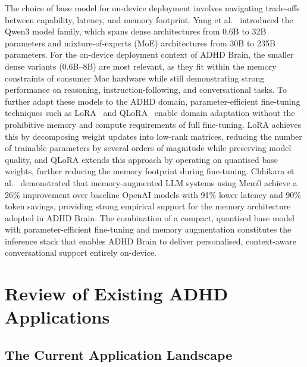 The choice of base model for on-device deployment involves navigating trade-offs between capability, latency, and memory footprint. Yang et al.~\cite{yang2025} introduced the Qwen3 model family, which spans dense architectures from 0.6B to 32B parameters and mixture-of-experts (MoE) architectures from 30B to 235B parameters. For the on-device deployment context of ADHD Brain, the smaller dense variants (0.6B--8B) are most relevant, as they fit within the memory constraints of consumer Mac hardware while still demonstrating strong performance on reasoning, instruction-following, and conversational tasks. To further adapt these models to the ADHD domain, parameter-efficient fine-tuning techniques such as LoRA~\cite{hu2022} and QLoRA~\cite{dettmers2023} enable domain adaptation without the prohibitive memory and compute requirements of full fine-tuning. LoRA achieves this by decomposing weight updates into low-rank matrices, reducing the number of trainable parameters by several orders of magnitude while preserving model quality, and QLoRA extends this approach by operating on quantised base weights, further reducing the memory footprint during fine-tuning. Chhikara et al.~\cite{chhikara2025} demonstrated that memory-augmented LLM systems using Mem0 achieve a 26\% improvement over baseline OpenAI models with 91\% lower latency and 90\% token savings, providing strong empirical support for the memory architecture adopted in ADHD Brain. The combination of a compact, quantised base model with parameter-efficient fine-tuning and memory augmentation constitutes the inference stack that enables ADHD Brain to deliver personalised, context-aware conversational support entirely on-device.

\section{Review of Existing ADHD Applications}
\label{sec:litrev_existing_apps}

\subsection{The Current Application Landscape}
\label{sec:litrev_app_landscape}

